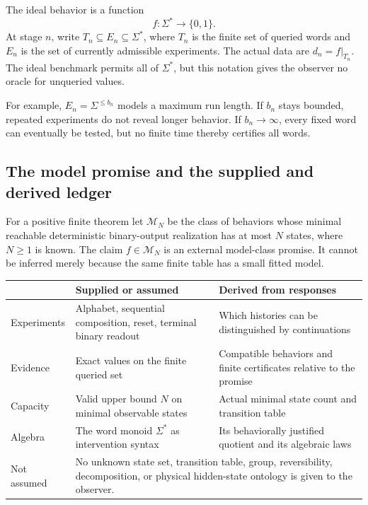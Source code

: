 \documentclass[11pt]{article}
\theoremstyle{remark}
\newcommand{\M}{\mathcal M}
\begin{document}
The ideal behavior is a function
\[
 f:\Sigma^*\longrightarrow\{0,1\}.
\]
At stage $n$, write $T_n\subseteq E_n\subseteq\Sigma^*$, where $T_n$ is the finite set of queried words and $E_n$ is the set of currently admissible experiments. The actual data are $d_n=f|_{T_n}$. The ideal benchmark permits all of $\Sigma^*$, but this notation gives the observer no oracle for unqueried values.

For example, $E_n=\Sigma^{\le b_n}$ models a maximum run length. If $b_n$ stays bounded, repeated experiments do not reveal longer behavior. If $b_n\to\infty$, every fixed word can eventually be tested, but no finite time thereby certifies all words.

\subsection{The model promise and the supplied and derived ledger}

For a positive finite theorem let $\M_N$ be the class of behaviors whose minimal reachable deterministic binary-output realization has at most $N$ states, where $N\ge1$ is known. The claim $f\in\M_N$ is an external model-class promise. It cannot be inferred merely because the same finite table has a small fitted model.

\begin{center}
\begin{tabularx}{\textwidth}{@{}p{}XX@{}}
\toprule
 & Supplied or assumed & Derived from responses \\
\midrule
Experiments & Alphabet, sequential composition, reset, terminal binary readout & Which histories can be distinguished by continuations \\
Evidence & Exact values on the finite queried set & Compatible behaviors and finite certificates relative to the promise \\
Capacity & Valid upper bound $N$ on minimal observable states & Actual minimal state count and transition table \\
Algebra & The word monoid $\Sigma^*$ as intervention syntax & Its behaviorally justified quotient and its algebraic laws \\
Not assumed & \multicolumn{2}{p{.74\textwidth}}{No unknown state set, transition table, group, reversibility, decomposition, or physical hidden-state ontology is given to the observer.} \\
\bottomrule
\end{tabularx}
\end{center}
\end{document}
